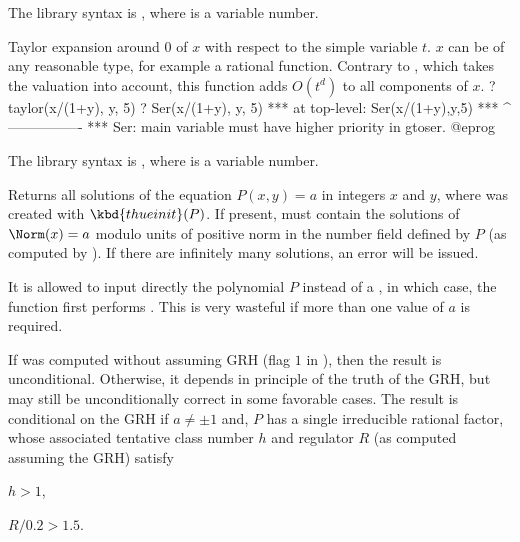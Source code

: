 The library syntax is , where  is a variable number.

\label{se:taylor}
Taylor expansion around $0$ of $x$ with respect to
the simple variable $t$. $x$ can be of any reasonable type, for example a
rational function. Contrary to , which takes the valuation into
account, this function adds $O(t^d)$ to all components of $x$.
\bprog
? taylor(x/(1+y), y, 5)
? Ser(x/(1+y), y, 5)
 ***   at top-level: Ser(x/(1+y),y,5)
 ***                 ^----------------
 *** Ser: main variable must have higher priority in gtoser.
@eprog

The library syntax is , where  is a variable number.

\label{se:thue}
Returns all solutions of the equation
$P(x,y)=a$ in integers $x$ and $y$, where  was created with
$\kbd{thueinit}(P)$. If present,  must contain the solutions of
$\Norm(x)=a$ modulo units of positive norm in the number field
defined by $P$ (as computed by ). If there are infinitely
many solutions, an error will be issued.

It is allowed to input directly the polynomial $P$ instead of a ,
in which case, the function first performs . This is
very wasteful if more than one value of $a$ is required.

If  was computed without assuming GRH (flag $1$ in ),
then the result is unconditional. Otherwise, it depends in principle of the
truth of the GRH, but may still be unconditionally correct in some
favorable cases. The result is conditional on the GRH if
$a\neq \pm 1$ and, $P$ has a single irreducible rational factor, whose
associated tentative class number $h$ and regulator $R$ (as computed
assuming the GRH) satisfy

\item $h > 1$,

\item $R/0.2 > 1.5$.

